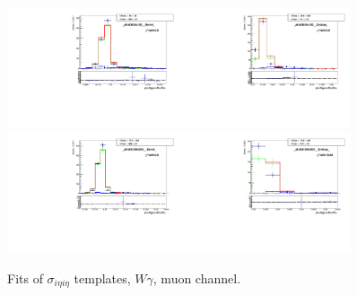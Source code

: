 \begin{figure}[htb]
\begin{center}
   \includegraphics[width=0.45\textwidth]{../figs/figs_v11/MUON_WGamma/TemplateFits/c_TEMPL_SIHIH_UNblind__phoEt95to120__Barrel__RooFit.pdf}\includegraphics[width=0.45\textwidth]{../figs/figs_v11/MUON_WGamma/TemplateFits/c_TEMPL_SIHIH_UNblind__phoEt95to120__Endcap__RooFit.pdf}\\
   \includegraphics[width=0.45\textwidth]{../figs/figs_v11/MUON_WGamma/TemplateFits/c_TEMPL_SIHIH_UNblind__phoEt120to500__Barrel__RooFit.pdf}\includegraphics[width=0.45\textwidth]{../figs/figs_v11/MUON_WGamma/TemplateFits/c_TEMPL_SIHIH_UNblind__phoEt120to500__Endcap__RooFit.pdf}\\
  \label{fig:templateFits_SIHIH_MUON_3}
  \caption{Fits of $\sigma_{i \eta i \eta}$ templates, $W\gamma$, muon channel.}
  \end{center}
\end{figure}

